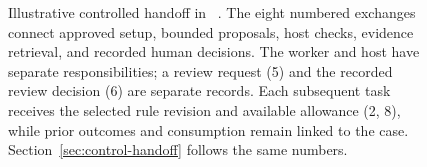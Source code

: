 \begin{figure}[t]
\centering

\caption{Illustrative controlled handoff in \workbench{}~\cite{scpCheckpoint}. The eight numbered exchanges connect approved setup, bounded proposals, host checks, evidence retrieval, and recorded human decisions. The worker and host have separate responsibilities; a review request (5) and the recorded review decision (6) are separate records. Each subsequent task receives the selected rule revision and available allowance (2, 8), while prior outcomes and consumption remain linked to the case. Section~\ref{sec:control-handoff} follows the same numbers.}
\label{fig:control-handoff}
\end{figure}





